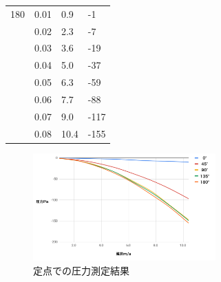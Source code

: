 \documentclass[twocolumn,10pt,a4j]{jsarticle}
\begin{document}
\begin{table}[]
\begin{tabular}{llll}
          180 & 0.01 & 0.9 & -1  \\
          & 0.02 & 2.3 & -7  \\
          & 0.03 & 3.6 & -19  \\
          & 0.04 & 5.0  & 	-37  \\
          & 0.05 & 6.3 	 & -59  \\
          & 0.06 & 7.7 	 & -88  \\
          & 0.07 & 9.0 	 & -117  \\
          & 0.08 & 10.4 	 & -155  \\
      \end{tabular}
    \end{table}
    \begin{figure}[]
      \begin{center}
        \includegraphics[width=7cm]{../img/graph1.png}
        \caption{定点での圧力測定結果}
      \end{center}
    \end{figure}
\end{document}
